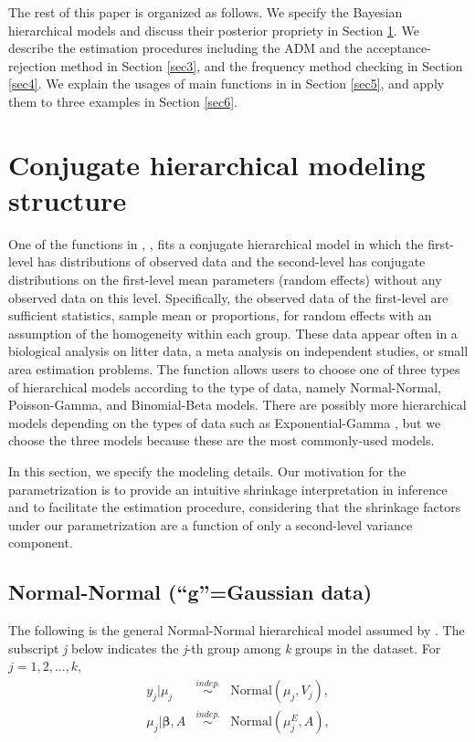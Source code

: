 \documentclass[article]{jss}
\begin{document}
The rest of this paper is organized as follows. We specify the Bayesian hierarchical models and discuss their posterior propriety in Section \ref{sec2}. We describe the estimation procedures including the ADM and the acceptance-rejection method in Section  \ref{sec3}, and the frequency method checking in Section \ref{sec4}.  We explain the usages of main functions in  in Section \ref{sec5}, and apply them to three examples in Section \ref{sec6}.



\section[Hierarchical Structure]{Conjugate hierarchical modeling structure} \label{sec2}

One of the functions in , , fits a conjugate hierarchical model in which the first-level has distributions of observed data and the second-level has conjugate distributions on the first-level mean parameters (random effects) without any observed data on this level. Specifically, the observed data of the first-level are sufficient statistics, sample mean or proportions, for random effects with an assumption of the homogeneity within each group. These data appear often in a biological analysis on litter data, a meta analysis on independent studies, or small area estimation problems. The  function allows users to choose one of three types of hierarchical models according to the type of data, namely Normal-Normal, Poisson-Gamma, and Binomial-Beta models. There are possibly more hierarchical models depending on the types of data such as Exponential-Gamma \citep{tang2002fitting}, but we choose the three models because these are the most commonly-used models.

In this section, we specify the modeling details. Our motivation for the parametrization is to provide an intuitive shrinkage interpretation in inference and to facilitate the estimation procedure, considering that the shrinkage factors under our parametrization are a function of only a second-level variance component.
 
\subsection[Normal-Normal]{Normal-Normal (``g''=Gaussian data)}
The following is the general Normal-Normal hierarchical model assumed by . The subscript \emph{j} below indicates the \emph{j}-th group among \emph{k} groups in the dataset. For $j=1, 2, \ldots, k$, 
\begin{eqnarray}
y_{j}\vert \mu_{j} & \stackrel{indep.}{\sim} &\textrm{Normal}(\mu_{j}, V_{j}),\label{normalobs}\\
\mu_{j}\vert \boldsymbol{\beta}, A & \stackrel{indep.}{\sim} &\textrm{Normal}(\mu^E_{j}, A),\label{normalprior}
\end{eqnarray}
\end{document}
